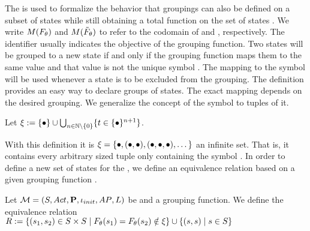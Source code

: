 \documentclass[preview]{standalone}
\begin{document}
The \grpfctsubN is used to formalize the behavior that groupings can also be defined on a subset of states while still obtaining a total function on the set of states \states. We write $M({F_{{\theta}}})$ and $M({\tilde{F}_{{\theta}}})$ to refer to the codomain of \grpfct and \grpfctsub, respectively. The identifier \viewppty usually indicates the objective of the grouping function. Two states will be grouped to a new state if and only if the grouping function maps them to the same value and that value is not the unique symbol \remelem. The mapping to the symbol \remelem will be used whenever a state is to be excluded from the grouping. The definition provides an easy way to declare groups of states. The exact mapping depends on the desired grouping. We generalize the concept of the symbol \remelem to tuples of it. 

\begin{definition}
	Let ${\xi} := \{{\bullet}\} \cup \bigcup_{n \in {\mathbb{N}} \setminus \{0\}} \{t \in \{{\bullet}\}^{n+1}\}$.
\end{definition}

With this definition it is ${\xi} = \{{\bullet}, ({\bullet}, {\bullet}), ({\bullet}, {\bullet}, {\bullet}), \dots\}$ an infinite set. That is, it contains every arbitrary sized tuple only containing the symbol \remelem. In order to define a new set of states for the \viewN, we define an equivalence relation \eqrelview based on a given grouping function \grpfct.

\begin{definition}
	Let ${{{\mathcal{M}}}} = {{({S}, {Act}, {\textbf{P}}, {\iota_{init}}, {AP}, {L})}}$ be \achgphN and \grpfct a grouping function. We define the equivalence relation ${R} :=\{ ({s}_1, {s}_2) \in {S} \times {S} \mid {F_{\ensuremath{{\theta}}}}({s}_1) = {F_{{\theta}}}({s}_2) \notin {\xi}\} \cup \{({s}, {s})  \mid {s} \in {S}\}$
	
	\label{def:eqrelview}
\end{definition}
\end{document}
